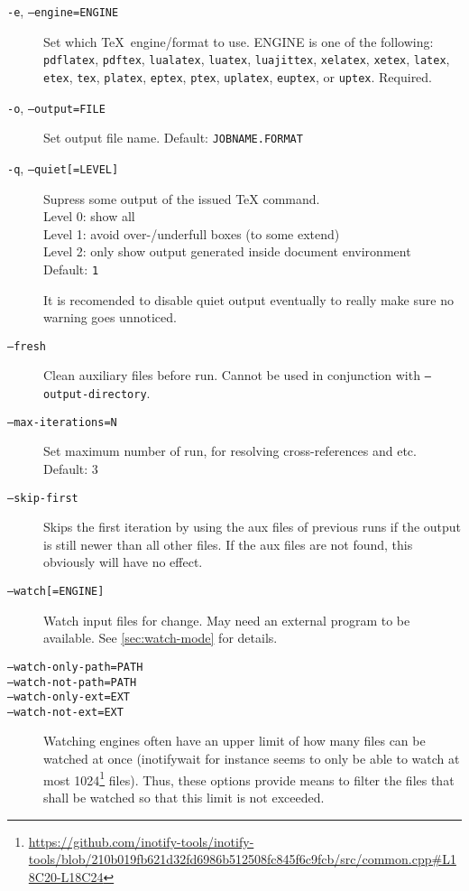 \documentclass[a4paper]{report}
\newcommand\metavar[1]{\textnormal{\textsf{#1}}}
\begin{document}
\begin{description}
\item[\texttt{-e}, \texttt{--engine=\metavar{ENGINE}}]
  Set which \TeX\ engine/format to use.
  \metavar{ENGINE} is one of the following:
  \texttt{pdflatex}, \texttt{pdftex},
  \texttt{lualatex}, \texttt{luatex}, \texttt{luajittex},
  \texttt{xelatex}, \texttt{xetex},
  \texttt{latex}, \texttt{etex}, \texttt{tex},
  \texttt{platex}, \texttt{eptex}, \texttt{ptex},
  \texttt{uplatex}, \texttt{euptex}, or \texttt{uptex}.
  Required.
\item[\texttt{-o}, \texttt{--output=\metavar{FILE}}]
  Set output file name.
  Default: \texttt{\metavar{JOBNAME}.\metavar{FORMAT}}
\item[\texttt{-q}, \texttt{--quiet[=\metavar{LEVEL}]}]
  Supress some output of the issued TeX command.\\
  Level 0: show all\\
  Level 1: avoid over-/underfull boxes (to some extend)\\
  Level 2: only show output generated inside document environment\\
  Default: \texttt{1}

  It is recomended to disable quiet output eventually to really make sure no warning goes unnoticed.
\item[\texttt{--fresh}]
  Clean auxiliary files before run.
  Cannot be used in conjunction with \texttt{--output-directory}.
\item[\texttt{--max-iterations=\metavar{N}}]
  Set maximum number of run, for resolving cross-references and etc.
  Default: 3
\item[\texttt{--skip-first}]
  Skips the first iteration by using the aux files of previous runs if the
  output is still newer than all other files. If the aux files are not found,
  this obviously will have no effect.
\item[\texttt{--watch[=\metavar{ENGINE}]}]
  Watch input files for change.
  May need an external program to be available.
  See \autoref{sec:watch-mode} for details.
\item[\texttt{--watch-only-path=\metavar{PATH}}]
\item[\texttt{--watch-not-path=\metavar{PATH}}]
\item[\texttt{--watch-only-ext=\metavar{EXT}}]
\item[\texttt{--watch-not-ext=\metavar{EXT}}]
  Watching engines often have an upper limit of how many files can be watched at once
  (inotifywait for instance seems to only be able to watch at most 1024\footnote{\url{https://github.com/inotify-tools/inotify-tools/blob/210b019fb621d32fd6986b512508fc845f6c9fcb/src/common.cpp\#L18C20-L18C24}} files). Thus, these options provide means to filter the files that shall be watched so that this limit is not exceeded.


\end{description}
\end{document}
